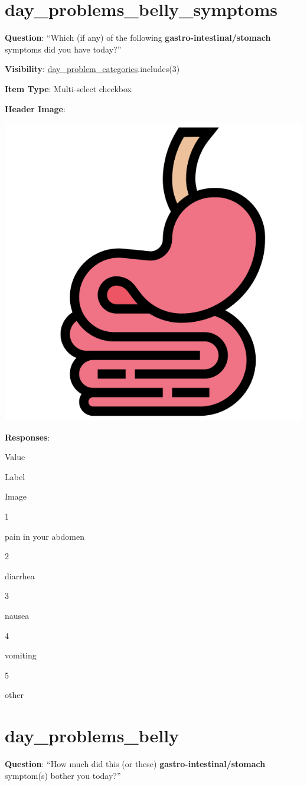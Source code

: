 \documentclass[]{book}
\begin{document}
\hypertarget{day_problems_belly_symptoms}{%
\section{day\_problems\_belly\_symptoms}\label{day_problems_belly_symptoms}}

\textbf{Question}: ``Which (if any) of the following \textbf{gastro-intestinal/stomach} symptoms did you have today?''

\textbf{Visibility}: \protect\hyperlink{day_problem_categories}{day\_problem\_categories}.includes(3)

\textbf{Item Type}: Multi-select checkbox

\textbf{Header Image}:

\begin{flushleft}\includegraphics[width=0.33\linewidth]{downloadFigs4latex_NIMH_Applet_Codebook/day_problems_belly_symptoms_headerImg} \end{flushleft}

\textbf{Responses}:

Value

Label

Image

1

pain in your abdomen

2

diarrhea

3

nausea

4

vomiting

5

other

\hypertarget{day_problems_belly}{%
\section{day\_problems\_belly}\label{day_problems_belly}}

\textbf{Question}: ``How much did this (or these) \textbf{gastro-intestinal/stomach} symptom(s) bother you today?''
\end{document}
